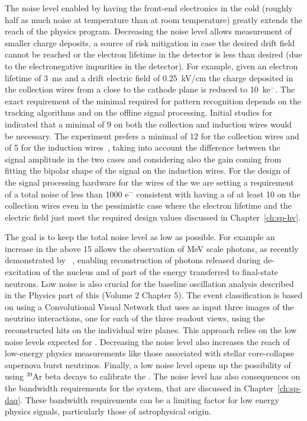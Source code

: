 The noise level enabled by having the front-end electronics in the cold (roughly 
half as much noise at  temperature than at room temperature) greatly 
extends the reach of the  physics program. Decreasing the noise level 
allows measurement of smaller charge deposits, a source of risk mitigation in 
case the desired drift field cannot be reached or the electron lifetime in the 
detector is less than desired (due to the electronegative impurities in the 
detector). For example, given an electron lifetime of \SI{3}{ms} and a drift electric field
of \SI{0.25}{kV/cm} the charge deposited in the collection wires from a 
 close to the cathode plane is reduced to \SI{10}{k}{e$^-$}.
The exact requirement of the minimal  required for pattern
recognition depends on the tracking algorithms and on the offline signal processing.
Initial studies for  indicated that a minimal  of 9 
on both the collection and induction wires would be necessary. The 
 experiment prefers a minimal  of 12 for the
collection wires and of 5 for the induction wires~\cite{bib:sbnddoc1921}, taking into account
the difference between the signal amplitude in the two cases and considering
also the gain coming from fitting the bipolar shape of the signal on the
induction wires. For the design of the signal processing hardware for the
wires of the   we are setting a requirement of
a total noise of less than 1000 e$^-$ consistent with having a 
of at least 10 on the collection wires even in the pessimistic case 
where the electron lifetime and the electric field just meet the
required design values discussed in Chapter~\ref{ch:sp-hv}.

The goal is to keep the total noise level as low as possible. For example an 
increase in the  above 15 allows the observation of MeV scale photons, 
as recently demonstrated by ~\cite{Acciarri:2018myr}, enabling 
reconstruction of photons released during de-excitation of the nucleus and of part
of the energy transferred to final-state neutrons. Low noise is also crucial
for the baseline oscillation analysis described in the Physics part of this
 (Volume 2 Chapter 5). The event classification is based
on using a Convolutional Visual Network that uses as input three images
of the neutrino interactions, one for each of the three readout views, using the
reconstructed hits on the individual wire planes. This approach relies
on the low noise levels expected for .
Decreasing the noise level also increases the reach of low-energy 
physics measurements like those associated with stellar core-collapse supernova 
burst neutrinos. Finally, a low noise level opens up the possibility of using 
$\mathrm{{}^{39}Ar}$ beta decays to calibrate the  .
The noise level has also consequences on the bandwidth requirements
for the  system, that are discussed in Chapter~\ref{ch:sp-daq}.
These bandwidth requirements can be a limiting factor for low energy
physics signals, particularly those of astrophysical origin.

